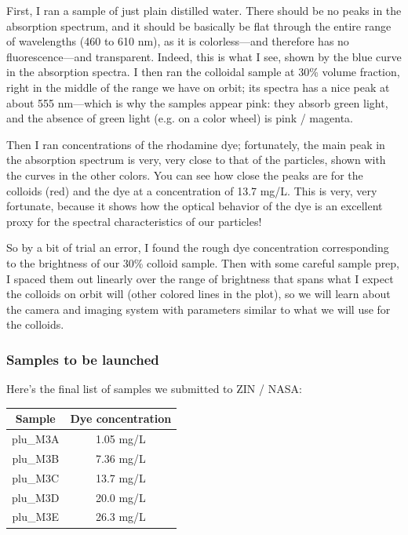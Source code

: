 First, I ran a sample of just plain distilled water. There should be no peaks in
the absorption spectrum, and it should be basically be flat through the entire
range of wavelengths (460 to 610 nm), as it is colorless---and therefore has no
fluorescence---and transparent. Indeed, this is what I see, shown by the blue
curve in the absorption spectra. I then ran the colloidal sample at 30\% volume
fraction, right in the middle of the range we have on orbit; its spectra has a
nice peak at about 555 nm---which is why the samples appear pink: they absorb
green light, and the absence of green light (e.g. on a color wheel) is pink /
magenta.

Then I ran concentrations of the rhodamine dye; fortunately, the main peak in
the absorption spectrum is very, very close to that of the particles, shown with
the curves in the other colors. You can see how close the peaks are for the
colloids (red) and the dye at a concentration of 13.7 mg/L. This is very, very
fortunate, because it shows how the optical behavior of the dye is an excellent
proxy for the spectral characteristics of our particles!

So by a bit of trial an error, I found the rough dye concentration corresponding
to the brightness of our 30\% colloid sample. Then with some careful sample
prep, I spaced them out linearly over the range of brightness that spans what I
expect the colloids on orbit will (other colored lines in the plot), so we will
learn about the camera and imaging system with parameters similar to what we
will use for the colloids.

\subsubsection{Samples to be launched}\label{samples-to-be-launched}

Here's the final list of samples we submitted to ZIN / NASA:

\begin{center}
\begin{tabular}{c|c}
\textbf{Sample} & \textbf{Dye concentration}\\
\hline
plu\_M3A & 1.05 mg/L\\
plu\_M3B & 7.36 mg/L\\
plu\_M3C & 13.7 mg/L\\
plu\_M3D & 20.0 mg/L\\
plu\_M3E & 26.3 mg/L\\
\end{tabular}
\end{center}


